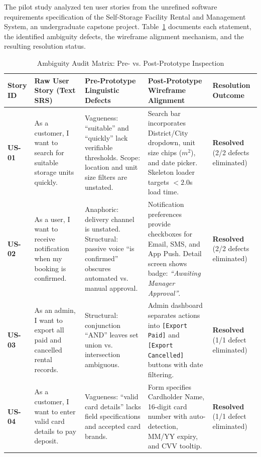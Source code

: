 \documentclass[11pt,a4paper]{article}
\begin{document}
The pilot study analyzed ten user stories from the unrefined software requirements specification of the Self-Storage Facility Rental and Management System, an undergraduate capstone project. Table~\ref{tab:audit_matrix} documents each statement, the identified ambiguity defects, the wireframe alignment mechanism, and the resulting resolution status.

\begin{table}[htbp]
\centering
\scriptsize
\caption{Ambiguity Audit Matrix: Pre- vs. Post-Prototype Inspection}
\label{tab:audit_matrix}
\begin{tabularx}{\textwidth}{p{} p{} p{} p{} p{}}
\toprule
\textbf{Story ID} & \textbf{Raw User Story (Text SRS)} & \textbf{Pre-Prototype Linguistic Defects} & \textbf{Post-Prototype Wireframe Alignment} & \textbf{Resolution Outcome} \\
\midrule
\textbf{US-01} & As a customer, I want to search for suitable storage units quickly. & Vagueness: ``suitable'' and ``quickly'' lack verifiable thresholds. Scope: location and unit size filters are unstated. & Search bar incorporates District/City dropdown, unit size chips ($m^2$), and date picker. Skeleton loader targets $< 2.0$s load time. & \textbf{Resolved} (2/2 defects eliminated) \\
\addlinespace
\textbf{US-02} & As a user, I want to receive notification when my booking is confirmed. & Anaphoric: delivery channel is unstated. Structural: passive voice ``is confirmed'' obscures automated vs. manual approval. & Notification preferences provide checkboxes for Email, SMS, and App Push. Detail screen shows badge: \textit{``Awaiting Manager Approval''}. & \textbf{Resolved} (2/2 defects eliminated) \\
\addlinespace
\textbf{US-03} & As an admin, I want to export all paid and cancelled rental records. & Structural: conjunction ``AND'' leaves set union vs. intersection ambiguous. & Admin dashboard separates actions into \texttt{[Export Paid]} and \texttt{[Export Cancelled]} buttons with date filtering. & \textbf{Resolved} (1/1 defect eliminated) \\
\addlinespace
\textbf{US-04} & As a customer, I want to enter valid card details to pay deposit. & Vagueness: ``valid card details'' lacks field specifications and accepted card brands. & Form specifies Cardholder Name, 16-digit card number with auto-detection, MM/YY expiry, and CVV tooltip. & \textbf{Resolved} (1/1 defect eliminated) \\

\end{tabularx}
\end{table}
\end{document}
